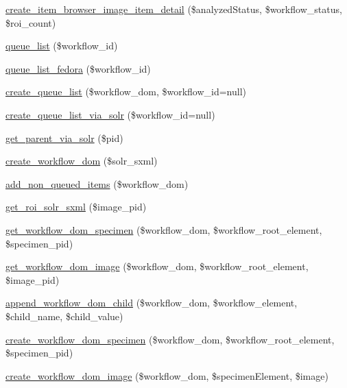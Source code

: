 \begin{DoxyCompactItemize}
\item 
\hyperlink{workspace_8functions_8php_a011940edca79f7189587b42798ac7f7e}{create\_\-item\_\-browser\_\-image\_\-item\_\-detail} (\$analyzedStatus, \$workflow\_\-status, \$roi\_\-count)
\item 
\hyperlink{workspace_8functions_8php_ae140dc481a8fe939aefbfa1dbd61f345}{queue\_\-list} (\$workflow\_\-id)
\item 
\hyperlink{workspace_8functions_8php_aae638a872b51c2508581ad462dd985bb}{queue\_\-list\_\-fedora} (\$workflow\_\-id)
\item 
\hyperlink{workspace_8functions_8php_a9e49f9eb721481e7144e045c3dc714d0}{create\_\-queue\_\-list} (\$workflow\_\-dom, \$workflow\_\-id=null)
\item 
\hyperlink{workspace_8functions_8php_a03809983fff35fb23a8e7d7788cc6b0e}{create\_\-queue\_\-list\_\-via\_\-solr} (\$workflow\_\-id=null)
\item 
\hyperlink{workspace_8functions_8php_a75e0ded2e7d256d7c50a84c8ec47acbd}{get\_\-parent\_\-via\_\-solr} (\$pid)
\item 
\hyperlink{workspace_8functions_8php_a004e58be3cc3bc417d4649db23f2089c}{create\_\-workflow\_\-dom} (\$solr\_\-sxml)
\item 
\hyperlink{workspace_8functions_8php_a6615ff66fec46bb4f8574f8d9910f5cb}{add\_\-non\_\-queued\_\-items} (\$workflow\_\-dom)
\item 
\hyperlink{workspace_8functions_8php_ae6abbcdfbf74b12c5d08a29ca8feafab}{get\_\-roi\_\-solr\_\-sxml} (\$image\_\-pid)
\item 
\hyperlink{workspace_8functions_8php_a6118f481ac5e7b30edc6442f7c181829}{get\_\-workflow\_\-dom\_\-specimen} (\$workflow\_\-dom, \$workflow\_\-root\_\-element, \$specimen\_\-pid)
\item 
\hyperlink{workspace_8functions_8php_a710d72e0f09268599d3349600150785e}{get\_\-workflow\_\-dom\_\-image} (\$workflow\_\-dom, \$workflow\_\-root\_\-element, \$image\_\-pid)
\item 
\hyperlink{workspace_8functions_8php_a245ca1ffb4324b1074534fd6db5ef0df}{append\_\-workflow\_\-dom\_\-child} (\$workflow\_\-dom, \$workflow\_\-element, \$child\_\-name, \$child\_\-value)
\item 
\hyperlink{workspace_8functions_8php_afc7c3079ed1dae453510d27a4bf09a82}{create\_\-workflow\_\-dom\_\-specimen} (\$workflow\_\-dom, \$workflow\_\-root\_\-element, \$specimen\_\-pid)
\item 
\hyperlink{workspace_8functions_8php_ad37f55c7999d3a7ea44fddd01846cf23}{create\_\-workflow\_\-dom\_\-image} (\$workflow\_\-dom, \$specimenElement, \$image)

\end{DoxyCompactItemize}
